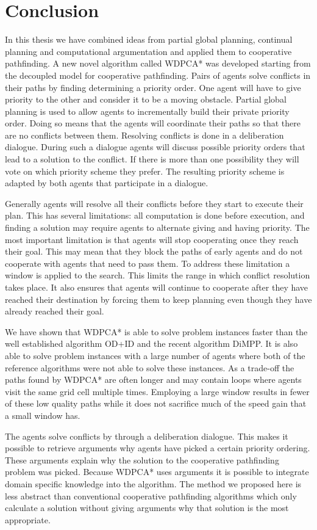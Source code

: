 \section{Conclusion}
In this thesis we have combined ideas from partial global planning, continual
planning and computational argumentation and applied them to cooperative 
pathfinding.
A new novel algorithm called WDPCA* was developed starting from the decoupled
model for cooperative pathfinding. Pairs of agents solve conflicts in their
paths by finding determining a priority order. One agent will have to give
priority to the other and consider it to be a moving obstacle. Partial global
planning is used to allow agents to incrementally build their private priority
order. Doing so means that the agents will coordinate their paths so that
there are no conflicts between them. Resolving conflicts is done in a
deliberation dialogue. During such a dialogue agents will discuss possible
priority orders that lead to a solution to the conflict. If there is more than
one possibility they will vote on which priority scheme they prefer. The
resulting priority scheme is adapted by both agents that participate in a
dialogue.

Generally agents will resolve all their conflicts before they start to execute
their plan. This has several limitations: all computation is done before
execution, and finding a solution may require agents to alternate giving and
having priority. The most important limitation is that agents will stop
cooperating once they reach their goal. This may mean that they block the paths
of early agents and do not cooperate with agents that need to pass them. To
address these limitation a window is applied to the search. This limits the
range in which conflict resolution takes place. It also ensures that agents
will continue to cooperate after they have reached their destination by forcing
them to keep planning even though they have already reached their goal.

We have shown that WDPCA* is able to solve problem instances faster than the
well established algorithm OD+ID and the recent algorithm DiMPP. It is
also able to solve problem instances with a large number of agents where both
of the reference algorithms were not able to solve these instances. As a
trade-off the paths found by WDPCA* are often longer and may contain loops
where agents visit the same grid cell multiple times. Employing a large window
results in fewer of these low quality paths while it does not sacrifice much of
the speed gain that a small window has.

The agents solve conflicts by through a deliberation dialogue. This makes it
possible to retrieve arguments why agents have picked a certain priority
ordering. These arguments explain why the solution to the cooperative
pathfinding problem was picked. Because WDPCA* uses arguments it is possible to
integrate domain specific knowledge into the algorithm. The method we proposed
here is less abstract than conventional cooperative pathfinding algorithms
which only calculate a solution without giving arguments why that solution is
the most appropriate.
